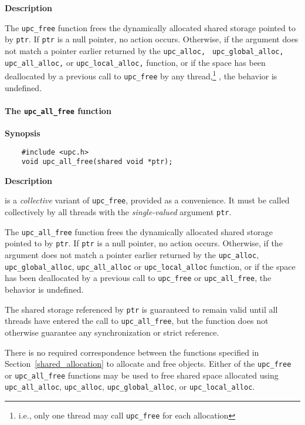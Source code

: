 {\bf Description}

\np The {\tt upc\_free} function frees the dynamically
    allocated shared storage pointed to by {\tt ptr}.  If {\tt ptr} is
    a null pointer, no action occurs.  Otherwise, if the argument does
    not match a pointer earlier returned by the {\tt upc\_alloc, } 
    {\tt upc\_global\_alloc,}  {\tt upc\_all\_alloc,}  or {\tt upc\_local\_alloc,} function,
    or if the space has been deallocated by a previous call
    to {\tt upc\_free} by any thread,\footnote{i.e., only one thread may call {\tt upc\_free} for
     each allocation} 
    , 
    the behavior is undefined.

\cbstart
\paragraph{The {\tt upc\_all\_free} function}

{\bf Synopsis} 

\npf\vspace{-2.5em}
\begin{verbatim}
    #include <upc.h> 
    void upc_all_free(shared void *ptr); 
\end{verbatim}

{\bf Description}

 is a {\em collective} variant of {\tt upc\_free}, provided as a convenience.
    It must be called collectively by all threads with the {\em single-valued} argument {\tt ptr}.

\np The {\tt upc\_all\_free} function frees the dynamically
    allocated shared storage pointed to by {\tt ptr}.  If {\tt ptr} is
    a null pointer, no action occurs.  Otherwise, if the argument does
    not match a pointer earlier returned by the {\tt upc\_alloc},
    {\tt upc\_global\_alloc},  {\tt upc\_all\_alloc}  or {\tt upc\_local\_alloc} function,
    or if the space has been deallocated by a previous call to {\tt upc\_free}
    or {\tt upc\_all\_free}, the behavior is undefined.

\np The shared storage referenced by {\tt ptr} is guaranteed to remain valid
    until all threads have entered the call to {\tt upc\_all\_free}, but the
    function does not otherwise guarantee any synchronization or strict reference.

\np There is no required correspondence between the functions specified 
    in Section~\ref{shared_allocation} to allocate and free objects.
    Either of the {\tt upc\_free} or {\tt upc\_all\_free} functions
    may be used to free shared space allocated using {\tt upc\_all\_alloc},
    {\tt upc\_alloc}, {\tt upc\_global\_alloc}, or {\tt upc\_local\_alloc}.

